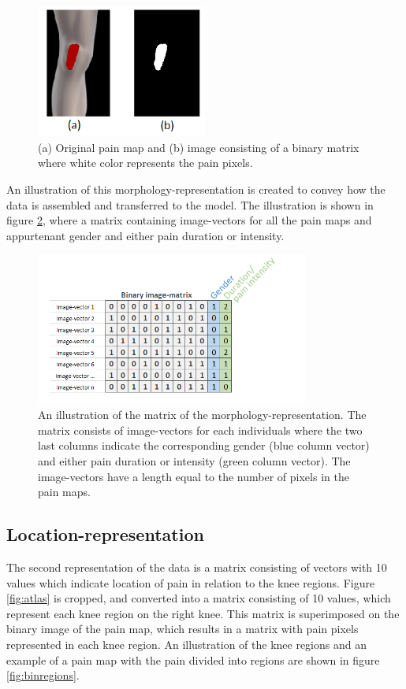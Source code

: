 \begin{figure} [H]
\centering
\includegraphics[width=0.5\textwidth]{figures/cropbin7}
\caption{(a) Original pain map and (b) image consisting of a binary matrix where white color represents the pain pixels.}
\label{fig:cropbin7}
\end{figure}

\noindent
An illustration of this morphology-representation is created to convey how the data is assembled and transferred to the model. The illustration is shown in figure \ref{fig:binmatrix}, where a matrix containing image-vectors for all the pain maps and appurtenant gender and either pain duration or intensity.

\begin{figure} [H]
\centering
\includegraphics[width=0.8\textwidth]{figures/binaryimagematrix}
\caption{An illustration of the matrix of the morphology-representation. The matrix consists of image-vectors for each individuals where the two last columns indicate the corresponding gender (blue column vector) and either pain duration or intensity (green column vector). The image-vectors have a length equal to the number of pixels in the pain maps.}
\label{fig:binmatrix}
\end{figure}


\subsection{Location-representation} \label{sec:Regions}
The second representation of the data is a matrix consisting of vectors with 10 values which indicate location of pain in relation to the knee regions.
Figure \ref{fig:atlas} is cropped, and converted into a matrix consisting of 10 values, which represent each knee region on the right knee. This matrix is superimposed on the binary image of the pain map, which results in a matrix with pain pixels represented in each knee region. 
An illustration of the knee regions and an example of a pain map with the pain divided into regions are shown in figure \ref{fig:binregions}.

